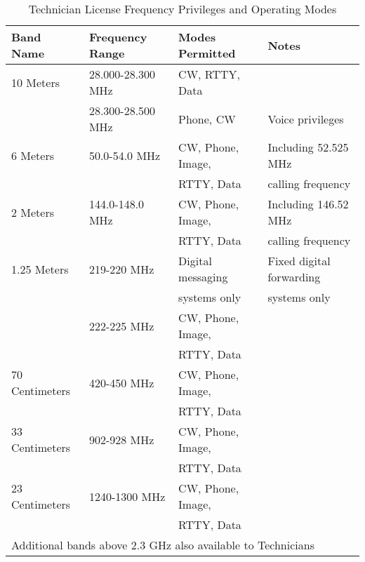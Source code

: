 \begin{table}[h]
    \centering
    \begin{tabular}{|l|l|l|l|}
        \hline
        \textbf{Band Name} & \textbf{Frequency Range} & \textbf{Modes Permitted} & \textbf{Notes} \\
        \hline
        10 Meters & 28.000-28.300 MHz & CW, RTTY, Data & \\
        & 28.300-28.500 MHz & Phone, CW & Voice privileges \\
        \hline
        6 Meters & 50.0-54.0 MHz & CW, Phone, Image, & Including 52.525 MHz \\
        & & RTTY, Data & calling frequency \\
        \hline
        2 Meters & 144.0-148.0 MHz & CW, Phone, Image, & Including 146.52 MHz \\
        & & RTTY, Data & calling frequency \\
        \hline
        1.25 Meters & 219-220 MHz & Digital messaging & Fixed digital forwarding \\
        & & systems only & systems only \\
        & 222-225 MHz & CW, Phone, Image, & \\
        & & RTTY, Data & \\
        \hline
        70 Centimeters & 420-450 MHz & CW, Phone, Image, & \\
        & & RTTY, Data & \\
        \hline
        33 Centimeters & 902-928 MHz & CW, Phone, Image, & \\
        & & RTTY, Data & \\
        \hline
        23 Centimeters & 1240-1300 MHz & CW, Phone, Image, & \\
        & & RTTY, Data & \\
        \hline
        \multicolumn{4}{|l|}{Additional bands above 2.3 GHz also available to Technicians} \\
        \hline
    \end{tabular}
    \caption{Technician License Frequency Privileges and Operating Modes}
    \label{tab:technician_privileges}
\end{table}

